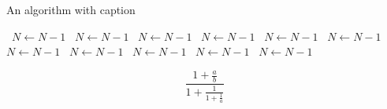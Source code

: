 \documentclass[a4paper]{article}
\begin{document}
\begin{algorithm}
\caption{An algorithm with caption}
\begin{algorithmic}
\    \State $N \gets N - 1$
\    \State $N \gets N - 1$
\    \State $N \gets N - 1$
\    \State $N \gets N - 1$
\    \State $N \gets N - 1$
\    \State $N \gets N - 1$
\    \State $N \gets N - 1$
\    \State $N \gets N - 1$
\    \State $N \gets N - 1$
\    \State $N \gets N - 1$
\    \State $N \gets N - 1$
\EndWhile
\end{algorithmic}
\end{algorithm}

\[ \frac{1+\frac{a}{b}}{1+\frac{1}{1+\frac{1}{a}}} \]
\end{document}
